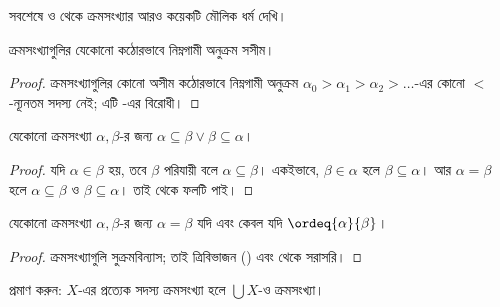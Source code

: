 \documentclass[../../../include/open-logic-section]{subfiles}
\begin{document}
সবশেষে  ও
 থেকে ক্রমসংখ্যার আরও
কয়েকটি মৌলিক ধর্ম দেখি।

\begin{prop}
ক্রমসংখ্যাগুলির যেকোনো কঠোরভাবে নিম্নগামী
অনুক্রম সসীম।
\end{prop}

\begin{proof}
ক্রমসংখ্যাগুলির কোনো অসীম কঠোরভাবে নিম্নগামী
অনুক্রম $\alpha_0 > \alpha_1 > \alpha_2 > \ldots$-এর
কোনো $<$-ন্যূনতম সদস্য নেই; এটি
-এর বিরোধী।
\end{proof}

\begin{prop}
যেকোনো ক্রমসংখ্যা $\alpha, \beta$-র জন্য
$\alpha \subseteq \beta \lor \beta \subseteq \alpha$।
\end{prop}

\begin{proof}
যদি $\alpha \in \beta$ হয়, তবে $\beta$
পরিযায়ী বলে $\alpha \subseteq \beta$।
একইভাবে, $\beta \in \alpha$ হলে
$\beta \subseteq \alpha$। আর $\alpha = \beta$
হলে $\alpha \subseteq \beta$ ও
$\beta \subseteq \alpha$। তাই
 থেকে ফলটি পাই।
\end{proof}

\begin{prop}
যেকোনো ক্রমসংখ্যা $\alpha, \beta$-র জন্য
$\alpha = \beta$ যদি এবং কেবল যদি
$\ordeq{\alpha}{\beta}$।
\end{prop}

\begin{proof}
ক্রমসংখ্যাগুলি সুক্রমবিন্যাস; তাই
ত্রিবিভাজন () এবং
 থেকে সরাসরি।
\end{proof}

\begin{prob}
প্রমাণ করুন: $X$-এর প্রত্যেক সদস্য ক্রমসংখ্যা
হলে $\bigcup X$-ও ক্রমসংখ্যা।
\end{prob}
\end{document}
